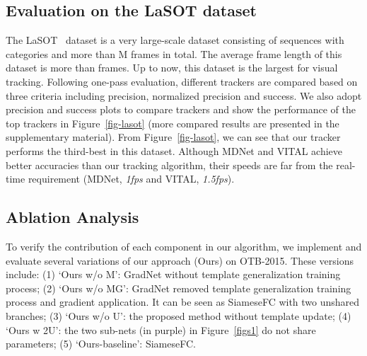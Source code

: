 \documentclass[10pt,twocolumn,letterpaper]{article}
\begin{document}
\subsection{Evaluation on the LaSOT dataset}
The LaSOT~\cite{LaSOT} dataset is a very large-scale dataset consisting of
 sequences with  categories and more than M frames in total.
The average frame length of this dataset is more than  frames. Up to
now, this dataset is the largest for visual tracking.
Following one-pass evaluation, different trackers are compared based on three
criteria including precision, normalized precision and success.
We also adopt precision and success plots to compare  trackers and show
the performance of the top  trackers in Figure~\ref{fig-lasot} (more compared results are
presented in the supplementary material).
From Figure~\ref{fig-lasot}, we can see that our tracker performs the third-best
in this dataset. Although MDNet and VITAL achieve better accuracies than our tracking algorithm, their speeds are far from the real-time requirement (MDNet, \textsl{1fps} and VITAL, \textsl{1.5fps}).


\subsection{Ablation Analysis}
\label{exp:ablation}
{}
To verify the contribution of each component in our algorithm, we implement and evaluate several variations of our approach (Ours) on OTB-2015. These versions include: (1) `Ours w/o M': GradNet without template generalization training process; (2) `Ours w/o MG': GradNet removed template generalization training process and gradient application. It can be seen as SiameseFC with two unshared branches; (3) `Ours w/o U': the proposed method without template update;  (4) `Ours w 2U': the two sub-nets (in purple) in Figure~\ref{figs1} do not share parameters; (5) `Ours-baseline': SiameseFC.


\begin{table}[h]
	\centering
	\caption{Precision and success scores on OTB-2015 for different variations of our algorithm. }
	\centering
		\label{table:db}
	\end{table}
\end{document}
